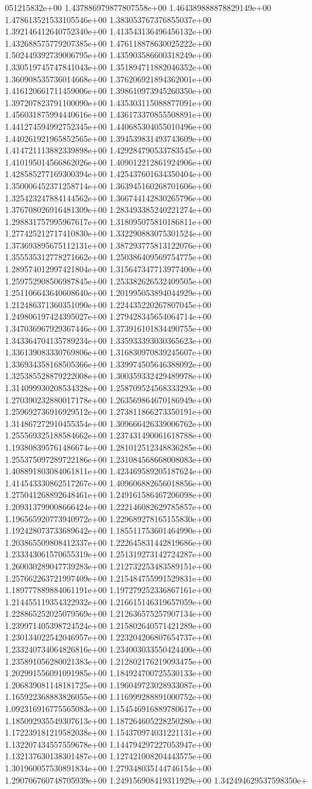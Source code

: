 051215832e+00	1.437886979877807558e+00	1.464389888878829149e+00	1.478613521533105546e+00	1.383053767376855037e+00	1.392146412640752340e+00	1.413543136496456132e+00	1.432688575779207385e+00	1.476118878630025222e+00	1.502449392739006795e+00	1.435903586600318249e+00	1.330519745747841043e+00	1.351894711882046352e+00	1.360908535736014668e+00	1.376206921894362001e+00	1.416120661711459006e+00	1.398610973945260350e+00	1.397207823791100090e+00	1.435303115088877091e+00	1.456031875994440616e+00	1.436173370855508891e+00	1.441274594992752345e+00	1.440685304055010496e+00	1.440261921965852565e+00	1.394539831493743609e+00	1.414721113882339898e+00	1.429284790533783545e+00	1.410195014566862026e+00	1.409012212861924906e+00	1.428585277169300394e+00	1.425437601634350404e+00	1.350006452371258714e+00	1.363945160268701606e+00	1.325423247884144562e+00	1.366744142830265796e+00	1.376708026916481309e+00	1.283493385240221274e+00	1.298831757995967617e+00	1.318095075810186811e+00	1.277425212717410830e+00	1.332290883075301524e+00	1.373693895675112131e+00	1.387293775813122076e+00	1.355535312778271662e+00	1.250386409569754775e+00	1.289574012997421804e+00	1.315647347713977400e+00	1.259752908506987845e+00	1.253382626532409505e+00	1.251106643640608640e+00	1.201995053894044929e+00	1.212486371360351090e+00	1.224435220267807045e+00	1.249806197424395027e+00	1.279428345654064714e+00	1.347036967929367446e+00	1.373916101834490755e+00	1.343364704135789234e+00	1.335933393030365623e+00	1.336139083330769806e+00	1.316830970839245607e+00	1.336934358168505366e+00	1.339974505646388092e+00	1.325385528879222008e+00	1.300359332429489978e+00	1.314099930208534328e+00	1.258709524568333293e+00	1.270390232880017178e+00	1.263569864670186949e+00	1.259692736916929512e+00	1.273811866273350191e+00	1.314867272910455354e+00	1.309666426339006762e+00	1.255569325188584662e+00	1.237431490061618788e+00	1.193808395761486674e+00	1.281012512348836285e+00	1.255375097289722186e+00	1.231084568668008083e+00	1.408891803084061811e+00	1.423469589205187624e+00	1.414543330862517267e+00	1.409606882656018856e+00	1.275041268892648461e+00	1.249161586467206098e+00	1.209313799008666424e+00	1.222146082629785857e+00	1.196565920773940972e+00	1.229689278165155830e+00	1.192428073733689642e+00	1.185511753601464990e+00	1.203865509808412337e+00	1.222645831442819686e+00	1.233343061570655319e+00	1.251319273142724287e+00	1.260030289047739283e+00	1.212732253483589151e+00	1.257662263721997409e+00	1.215484755991529831e+00	1.189777889884061191e+00	1.197279252336867161e+00	1.214455119354322932e+00	1.216615146319657059e+00	1.228865252025079569e+00	1.212636575257907134e+00	1.239971405398724524e+00	1.215802640571421289e+00	1.230134022542046957e+00	1.223204206807654737e+00	1.233240734064826816e+00	1.234003033550424400e+00	1.235891056280021383e+00	1.212802176219093475e+00	1.202991556091091985e+00	1.184924700725530133e+00	1.206839081148181725e+00	1.196049723028933087e+00	1.165922368883826055e+00	1.116999288891000752e+00	1.092316916775565083e+00	1.154546916889780617e+00	1.185092935549307613e+00	1.187264605228250280e+00	1.172239181219582038e+00	1.154370974031221131e+00	1.132207434557559678e+00	1.144794297227053947e+00	1.132137630138301487e+00	1.127421008204443575e+00	1.301960057530891834e+00	1.279348035144746154e+00	1.290706760748705939e+00	1.249156908419311929e+00	1.342494629537598350e+